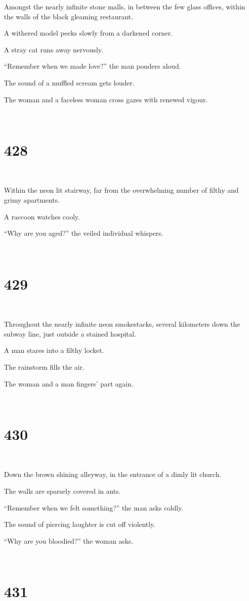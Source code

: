 \documentclass{report}
\begin{document}
Amongst the nearly infinite stone malls, in between the few glass offices, within the walls of the black gleaming restaurant.

A withered model peeks slowly from a darkened corner.

A stray cat runs away nervously.

``Remember when we made love?'' the man ponders aloud.

The sound of a muffled scream gets louder.

The woman and a faceless woman cross gazes with renewed vigour.

~
\chapter*{428}
~

Within the neon lit stairway, far from the overwhelming number of filthy and grimy apartments.

A raccoon watches cooly.

``Why are you aged?'' the veiled individual whispers.

~
\chapter*{429}
~

Throughout the nearly infinite neon smokestacks, several kilometers down the subway line, just outside a stained hospital.

A man stares into a filthy locket.

The rainstorm fills the air.

The woman and a man fingers' part again.

~
\chapter*{430}
~

Down the brown shining alleyway, in the entrance of a dimly lit church.

The walls are sparsely covered in ants.

``Remember when we felt something?'' the man asks coldly.

The sound of piercing laughter is cut off violently.

``Why are you bloodied?'' the woman asks.

~
\chapter*{431}
~
\end{document}
